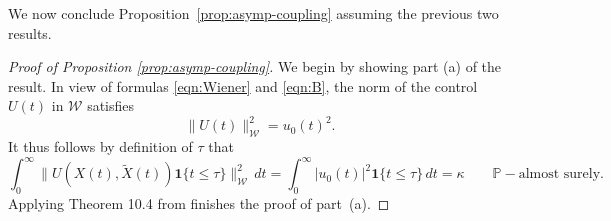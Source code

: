 \documentclass[11pt]{amsart}
\theoremstyle{definition}
\newcommand{\W}{\mathcal{W}}
\newcommand{\Xtil}{\widetilde{X}}
\theoremstyle{definition}
\theoremstyle{plain}
\numberwithin{equation}{section}
\begin{document}
We now conclude Proposition~\ref{prop:asymp-coupling} assuming the previous two results.  
\begin{proof}[Proof of Proposition \ref{prop:asymp-coupling}]  We begin by showing part (a) of the result.  In view of formulas \eqref{eqn:Wiener} and \eqref{eqn:B}, the norm of the control $U(t)$ in $\W$ satisfies
\begin{equation*}
\|U(t)\|_\W^2=u_0(t)^2 .  
\end{equation*}
It thus follows by definition of $\tau$ that 
\begin{equation*}
\int_0^\infty \|U(X(t),\Xtil(t))\textbf{1}\{t\leq\tau\}\|_\W^2 \, dt = \int_0^\infty |u_0(t)|^2 \textbf{1}\{t\leq\tau\}\, dt=\kappa\qquad \mathbb{P}-\text{almost surely}.
\end{equation*}
Applying Theorem 10.4 from \cite{da2014stochastic} finishes the proof of part~(a).  


\end{proof}
\end{document}
